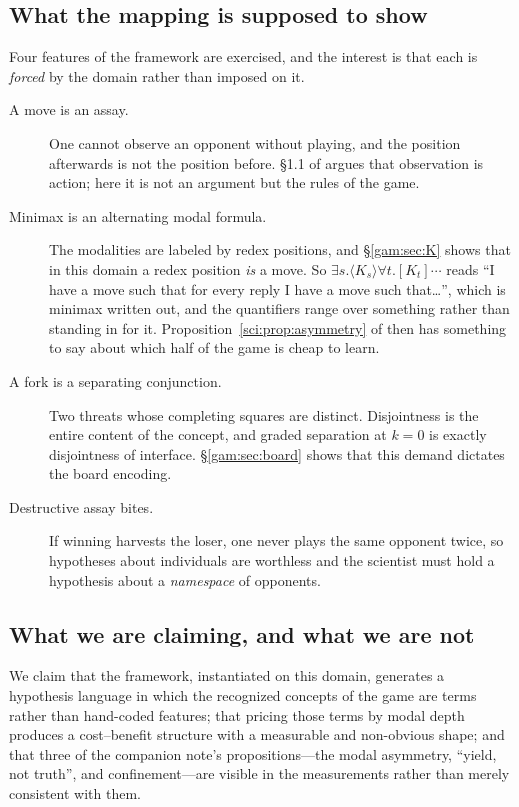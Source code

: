 \subsection{What the mapping is supposed to show}\label{gam:S1.2}

Four features of the framework are exercised, and the interest is that each is
\emph{forced} by the domain rather than imposed on it.

\begin{description}
\item[A move is an assay.] One cannot observe an opponent without playing, and
  the position afterwards is not the position before. \S1.1 of \chSci
  argues that observation is action; here it is not an argument but the rules of
  the game.
\item[Minimax is an alternating modal formula.] The modalities are labeled by
  redex positions, and \S\ref{gam:sec:K} shows that in this domain a redex position
  \emph{is} a move. So $\exists s.\langle K_s\rangle \forall t. [K_t]\cdots$
  reads ``I have a move such that for every reply I have a move
  such that\ldots'', which is minimax written out, and the quantifiers range
  over something rather than standing in for it. Proposition~\ref{sci:prop:asymmetry} of
  \chSci then has something to say about which half of the game is
  cheap to learn.
\item[A fork is a separating conjunction.] Two threats whose completing squares
  are distinct. Disjointness is the entire content of the concept, and graded
  separation at $k=0$ is exactly disjointness of interface. \S\ref{gam:sec:board}
  shows that this demand dictates the board encoding.
\item[Destructive assay bites.] If winning harvests the loser, one never plays
  the same opponent twice, so hypotheses about individuals are worthless and the
  scientist must hold a hypothesis about a \emph{namespace} of opponents.
\end{description}

\subsection{What we are claiming, and what we are not}\label{gam:S1.3}

We claim that the framework, instantiated on this domain, generates a hypothesis
language in which the recognized concepts of the game are terms rather than
hand-coded features; that pricing those terms by modal depth produces a
cost--benefit structure with a measurable and non-obvious shape; and that three
of the companion note's propositions---the modal asymmetry, ``yield, not
truth'', and confinement---are visible in the measurements rather than merely
consistent with them.

